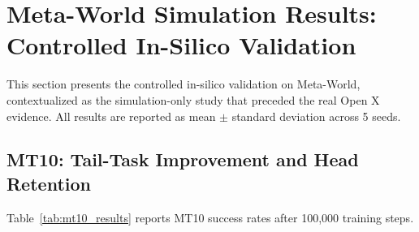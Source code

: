 \documentclass[10pt]{article}
\begin{document}
\section{Meta-World Simulation Results: Controlled In-Silico Validation}
\label{sec:metaworld}

This section presents the controlled in-silico validation on Meta-World, contextualized
as the simulation-only study that preceded the real Open X evidence.  All results are
reported as mean $\pm$ standard deviation across 5 seeds.

\subsection{MT10: Tail-Task Improvement and Head Retention}
\label{sec:mt10}

Table~\ref{tab:mt10_results} reports MT10 success rates after 100,000 training steps.
\end{document}
